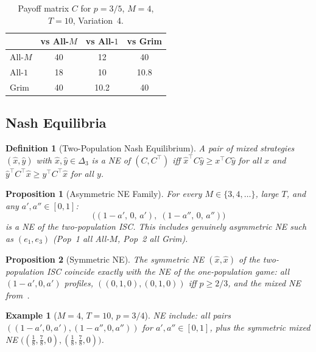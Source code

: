 \documentclass[12pt,a4paper]{article}
\newtheorem{definition}{Definition}[section]
\newtheorem{proposition}{Proposition}[section]
\newtheorem{example}{Example}[section]
\begin{document}
\begin{table}[H]
\centering
\caption{Payoff matrix $C$ for $p=3/5$, $M=4$, $T=10$, Variation~4.}
\label{tab:v4_C_p060}
\renewcommand{\arraystretch}{1.2}
\begin{tabular}{lccc}
\toprule
           & vs All-$M$ & vs All-$1$ & vs Grim \\
\midrule
All-$M$    & 40 & 12  & 40    \\
All-$1$    & 18 & 10  & 10.8  \\
Grim       & 40 & 10.2 & 40   \\
\bottomrule
\end{tabular}
\end{table}

\subsection{Nash Equilibria}

\begin{definition}[Two-Population Nash Equilibrium]
A pair of mixed strategies $(\hat x, \hat y)$ with $\hat x,\hat y\in\Delta_3$
is a NE of $(C,C^\top)$ iff
$\hat x^\top C\hat y \geq x^\top C\hat y$ for all $x$ and
$\hat y^\top C^\top\hat x \geq y^\top C^\top\hat x$ for all $y$.
\end{definition}

\begin{proposition}[Asymmetric NE Family]\label{prop:v4_NEfamily}
For every $M\in\{3,4,\ldots\}$, large $T$, and any $a',a''\in[0,1]$:
\[
  \bigl((1-a',\,0,\,a'),\;(1-a'',\,0,\,a'')\bigr)
\]
is a NE of the two-population ISC. This includes genuinely \emph{asymmetric} NE
such as $(e_1,e_3)$ (Pop~1 all All-$M$, Pop~2 all Grim).
\end{proposition}

\begin{proposition}[Symmetric NE]
The symmetric NE $(\hat x,\hat x)$ of the two-population ISC coincide exactly
with the NE of the one-population game: all $(1-a',0,a')$ profiles,
$((0,1,0),(0,1,0))$ iff $p\geq 2/3$, and the mixed NE from~\cite{LK2026}.
\end{proposition}

\begin{example}[$M=4$, $T=10$, $p=3/4$]
NE include: all pairs $((1-a',0,a'),(1-a'',0,a''))$ for $a',a''\in[0,1]$,
plus the symmetric mixed NE
$\bigl((\tfrac{1}{8},\tfrac{7}{8},0),(\tfrac{1}{8},\tfrac{7}{8},0)\bigr)$.
\end{example}
\end{document}
